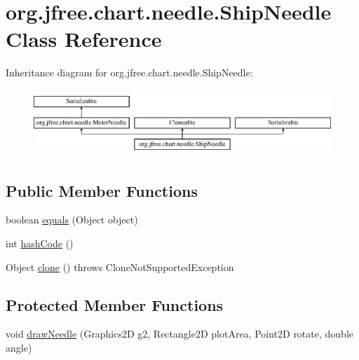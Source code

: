 \hypertarget{classorg_1_1jfree_1_1chart_1_1needle_1_1_ship_needle}{}\section{org.\+jfree.\+chart.\+needle.\+Ship\+Needle Class Reference}
\label{classorg_1_1jfree_1_1chart_1_1needle_1_1_ship_needle}
Inheritance diagram for org.\+jfree.\+chart.\+needle.\+Ship\+Needle\+:\begin{figure}[H]
\begin{center}
\leavevmode
\includegraphics[height=2.533937cm]{classorg_1_1jfree_1_1chart_1_1needle_1_1_ship_needle}
\end{center}
\end{figure}
\subsection*{Public Member Functions}
\begin{DoxyCompactItemize}
\item 
boolean \mbox{\hyperlink{classorg_1_1jfree_1_1chart_1_1needle_1_1_ship_needle_a581ec4ff5909f509e975d0e0d96ac414}{equals}} (Object object)
\item 
int \mbox{\hyperlink{classorg_1_1jfree_1_1chart_1_1needle_1_1_ship_needle_ab75d1de44e8f7cd46e3de939f7bc51b8}{hash\+Code}} ()
\item 
Object \mbox{\hyperlink{classorg_1_1jfree_1_1chart_1_1needle_1_1_ship_needle_aa7a3c4048bfd3eee00bbeb41821f22a6}{clone}} ()  throws Clone\+Not\+Supported\+Exception 
\end{DoxyCompactItemize}
\subsection*{Protected Member Functions}
\begin{DoxyCompactItemize}
\item 
void \mbox{\hyperlink{classorg_1_1jfree_1_1chart_1_1needle_1_1_ship_needle_a67cead7951249e3791e95f4736bf2c07}{draw\+Needle}} (Graphics2D g2, Rectangle2D plot\+Area, Point2D rotate, double angle)
\end{DoxyCompactItemize}
